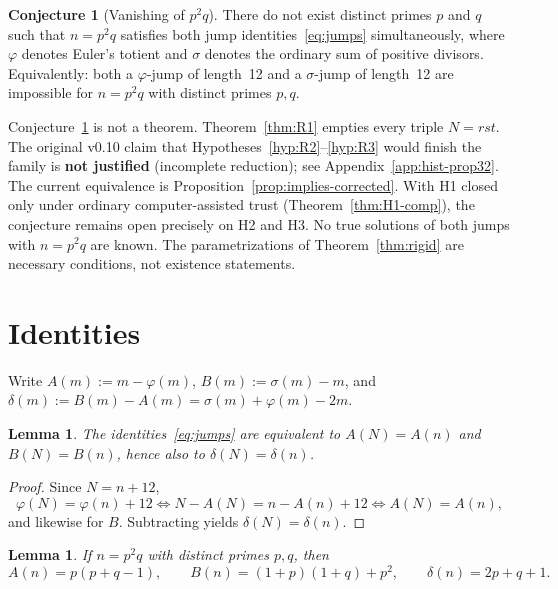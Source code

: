 \documentclass[11pt,reqno]{amsart}
\newcommand{\ph}{\varphi}
\newcommand{\sig}{\sigma}
\newtheorem{lemma}[theorem]{Lemma}
\theoremstyle{definition}
\newtheorem{conjecture}[theorem]{Conjecture}
\begin{document}
\begin{conjecture}[Vanishing of \(p^2q\)]
\label{conj:vanish}
There do not exist distinct primes \(p\) and \(q\) such that \(n=p^2q\) satisfies both jump identities~\eqref{eq:jumps} simultaneously, where \(\ph\) denotes Euler's totient and \(\sig\) denotes the ordinary sum of positive divisors. Equivalently: both a \(\ph\)-jump of length~12 and a \(\sig\)-jump of length~12 are impossible for \(n=p^2q\) with distinct primes \(p,q\).
\end{conjecture}

Conjecture~\ref{conj:vanish} is not a theorem. Theorem~\ref{thm:R1} empties every triple \(N=rst\). The original v0.10 claim that Hypotheses~\ref{hyp:R2}--\ref{hyp:R3} would finish the family is \textbf{not justified} (incomplete reduction); see Appendix~\ref{app:hist-prop32}. The current equivalence is Proposition~\ref{prop:implies-corrected}. With H1 closed only under ordinary computer-assisted trust (Theorem~\ref{thm:H1-comp}), the conjecture remains open precisely on H2 and H3. No true solutions of both jumps with \(n=p^2q\) are known. The parametrizations of Theorem~\ref{thm:rigid} are necessary conditions, not existence statements.

\section{Identities}
\label{sec:ident}

Write \(A(m):=m-\ph(m)\), \(B(m):=\sig(m)-m\), and \(\delta(m):=B(m)-A(m)=\sig(m)+\ph(m)-2m\).

\begin{lemma}
\label{lem:equiv}
The identities~\eqref{eq:jumps} are equivalent to \(A(N)=A(n)\) and \(B(N)=B(n)\), hence also to \(\delta(N)=\delta(n)\).
\end{lemma}

\begin{proof}
Since \(N=n+12\),
\[
\ph(N)=\ph(n)+12\iff N-A(N)=n-A(n)+12\iff A(N)=A(n),
\]
and likewise for \(B\). Subtracting yields \(\delta(N)=\delta(n)\).
\end{proof}

\begin{lemma}
\label{lem:AB}
If \(n=p^2q\) with distinct primes \(p,q\), then
\begin{equation}
\label{eq:An}
A(n)=p(p+q-1),\qquad
B(n)=(1+p)(1+q)+p^2,\qquad
\delta(n)=2p+q+1.
\end{equation}
\end{lemma}
\end{document}
